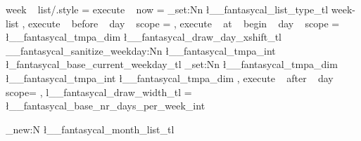 \tikzset
  {
    week ~ list/.style = 
      {
        execute  ~ now = { \tl_set:Nn \l__fantasycal_list_type_tl { week-list } } ,
        execute ~ before ~ day ~ scope =
          {
              {
                  { 
                    \pgftransformyshift{-\pgf@y}
                  } 
              }
          }
        ,
        execute ~ at ~ begin ~ day ~ scope =
          {
            \pgfmathsetlength \l__fantasycal_tmpa_dim { \l__fantasycal_draw_day_xshift_tl}
            \__fantasycal_sanitize_weekday:Nn \l__fantasycal_tmpa_int
              { \l_fantasycal_base_current_weekday_tl }
            \dim_set:Nn \l__fantasycal_tmpa_dim 
              { \l__fantasycal_tmpa_int \l__fantasycal_tmpa_dim }
          }
        ,
        execute ~ after ~ day ~ scope=
          {
              {
              }
          }
        ,
        l__fantasycal_draw_width_tl = \l__fantasycal_base_nr_days_per_week_int
      }    
  }
    
    
    

%

\tl_new:N \l__fantasycal_month_list_tl

